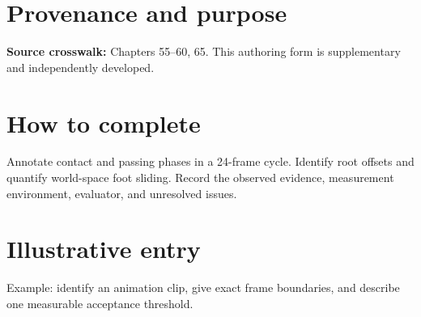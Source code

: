\documentclass[10pt,letterpaper]{article}
\begin{document}
\makedoctitle
\makedocsummary

\section{Provenance and purpose}
\textbf{Source crosswalk:} Chapters 55--60, 65. This authoring form is supplementary and independently developed.
\section{How to complete}
Annotate contact and passing phases in a 24-frame cycle. Identify root offsets and quantify world-space foot sliding. Record the observed evidence, measurement environment, evaluator, and unresolved issues. 
\section{Illustrative entry}
Example: identify an animation clip, give exact frame boundaries, and describe one measurable acceptance threshold.
\end{document}
